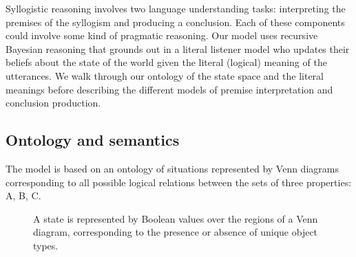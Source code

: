 \documentclass[floatsintext, doc]{apa6}
\begin{document}
Syllogistic reasoning involves two language understanding tasks: interpreting the premises of the syllogism and producing a conclusion.
Each of these components could involve some kind of pragmatic reasoning.
Our model uses recursive Bayesian reasoning that grounds out in a literal listener model who updates their beliefs about the state of the world given the literal (logical) meaning of the utterances. 
We walk through our ontology of the state space and the literal meanings before describing the different models of premise interpretation and conclusion production. 


\subsection{Ontology and semantics}

The model is based on an ontology of situations represented by Venn diagrams corresponding to all possible logical relations between the sets of three properties: A, B, C. 

\begin{figure}[h]
\centering
{}
\label{fig:venn}
\caption{A state is represented by Boolean values over the regions of a Venn diagram, corresponding to the presence or absence of unique object types.}
\end{figure}
\end{document}
